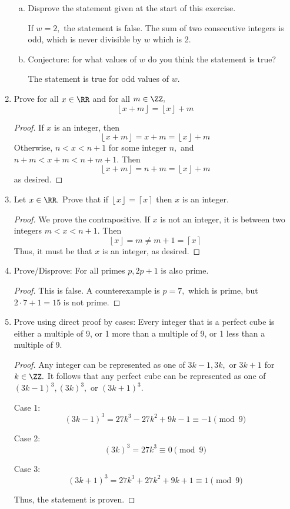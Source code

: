 \documentclass{article}
\begin{document}
\begin{enumerate}
\begin{enumerate}[(a)]
			\item Disprove the statement given at the start of this exercise.
				\begin{soln}
					If $w=2,$ the statement is false. The sum of two consecutive integers is odd, which is never divisible by $w$ which is 2.
				\end{soln}

			\item Conjecture: for what values of $w$ do you think the statement is true?
				\begin{answer*}
					The statement is true for odd values of $w.$
				\end{answer*}

		\end{enumerate}

	\item Prove for all $x\in\RR$ and for all $m\in\ZZ,$ 
		\[\left\lfloor x+m \right\rfloor=\left\lfloor x \right\rfloor+m\]
		\begin{proof}
			If $x$ is an integer, then
			\[\left\lfloor x+m \right\rfloor=x+m=\left\lfloor x \right\rfloor+m\]
			Otherwise, $n<x<n+1$ for some integer $n,$ and $n+m<x+m<n+m+1.$ Then
			\[\left\lfloor x+m \right\rfloor=n+m=\left\lfloor x \right\rfloor+m\]
			as desired.
		\end{proof}

	\item Let $x\in\RR.$ Prove that if $\left\lfloor x \right\rfloor=\left\lceil x \right\rceil$ then $x$ is an integer.
		\begin{proof}
			We prove the contrapositive. If $x$ is not an integer, it is between two integers $m<x<n+1.$ Then
			\[\left\lfloor x \right\rfloor=m\neq m+1=\left\lceil x \right\rceil\]
			Thus, it must be that $x$ is an integer, as desired.
		\end{proof}

	\item Prove/Disprove: For all primes $p, 2p+1$ is also prime.
		\begin{proof}
			This is false. A counterexample is $p=7,$ which is prime, but $2\cdot7+1=15$ is not prime.
		\end{proof}

	\item Prove using direct proof by cases: Every integer that is a perfect cube is either a multiple of 9, or 1 more than a multiple of 9, or 1 less than a multiple of 9.
		\begin{proof}
			Any integer can be represented as one of $3k-1, 3k,$ or $3k+1$ for $k\in\ZZ.$ It follows that any perfect cube can be represented as one of $(3k-1)^3, (3k)^3,$ or $(3k+1)^3.$ 

			Case 1:
			\[(3k-1)^3=27k^3-27k^2+9k-1\equiv-1\pmod 9\]

			Case 2:
			\[(3k)^3=27k^3\equiv0\pmod 9\]

			Case 3:
			\[(3k+1)^3=27k^3+27k^2+9k+1\equiv1\pmod 9\]

			Thus, the statement is proven.
		\end{proof}
		
\end{enumerate}
\end{document}

